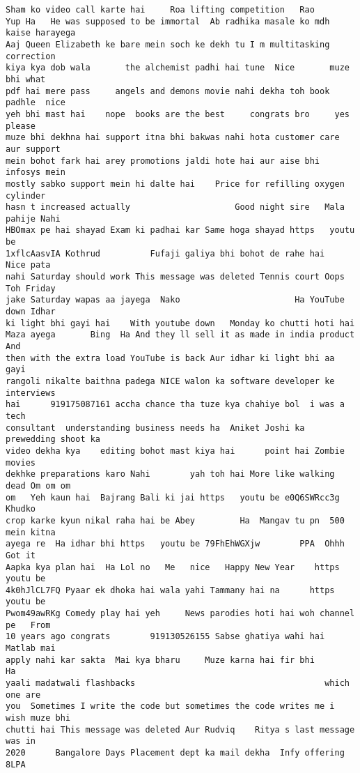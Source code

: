 \documentclass[11pt]{article}
\begin{document}
\begin{tcolorbox}[breakable, size=fbox, boxrule=.5pt, pad at break*=1mm, opacityfill=0]
\begin{Verbatim}[commandchars=\\\{\}]
Sham ko video call karte hai     Roa lifting competition   Rao
Yup Ha   He was supposed to be immortal  Ab radhika masale ko mdh kaise harayega
Aaj Queen Elizabeth ke bare mein soch ke dekh tu I m multitasking    correction
kiya kya dob wala       the alchemist padhi hai tune  Nice       muze bhi what
pdf hai mere pass     angels and demons movie nahi dekha toh book padhle  nice
yeh bhi mast hai    nope  books are the best     congrats bro     yes please
muze bhi dekhna hai support itna bhi bakwas nahi hota customer care aur support
mein bohot fark hai arey promotions jaldi hote hai aur aise bhi infosys mein
mostly sabko support mein hi dalte hai    Price for refilling oxygen cylinder
hasn t increased actually                     Good night sire   Mala pahije Nahi
HBOmax pe hai shayad Exam ki padhai kar Same hoga shayad https   youtu be
1xflcAasvIA Kothrud          Fufaji galiya bhi bohot de rahe hai    Nice pata
nahi Saturday should work This message was deleted Tennis court Oops Toh Friday
jake Saturday wapas aa jayega  Nako                       Ha YouTube down Idhar
ki light bhi gayi hai    With youtube down   Monday ko chutti hoti hai
Maza ayega       Bing  Ha And they ll sell it as made in india product      And
then with the extra load YouTube is back Aur idhar ki light bhi aa gayi
rangoli nikalte baithna padega NICE walon ka software developer ke interviews
hai      919175087161 accha chance tha tuze kya chahiye bol  i was a tech
consultant  understanding business needs ha  Aniket Joshi ka prewedding shoot ka
video dekha kya    editing bohot mast kiya hai      point hai Zombie movies
dekhke preparations karo Nahi        yah toh hai More like walking dead Om om om
om   Yeh kaun hai  Bajrang Bali ki jai https   youtu be e0Q6SWRcc3g   Khudko
crop karke kyun nikal raha hai be Abey         Ha  Mangav tu pn  500 mein kitna
ayega re  Ha idhar bhi https   youtu be 79FhEhWGXjw        PPA  Ohhh Got it
Aapka kya plan hai  Ha Lol no   Me   nice   Happy New Year    https   youtu be
4k0hJlCL7FQ Pyaar ek dhoka hai wala yahi Tammany hai na      https   youtu be
Pwom49awRKg Comedy play hai yeh     News parodies hoti hai woh channel pe   From
10 years ago congrats        919130526155 Sabse ghatiya wahi hai Matlab mai
apply nahi kar sakta  Mai kya bharu     Muze karna hai fir bhi           Ha
yaali madatwali flashbacks                                      which one are
you  Sometimes I write the code but sometimes the code writes me i wish muze bhi
chutti hai This message was deleted Aur Rudviq    Ritya s last message was in
2020      Bangalore Days Placement dept ka mail dekha  Infy offering 8LPA

\end{Verbatim}
\end{tcolorbox}
\end{document}
